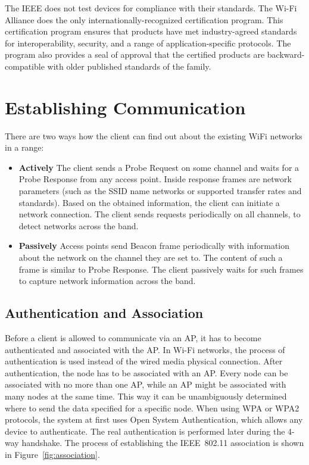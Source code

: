 The IEEE does not test devices for compliance with their standards. The Wi-Fi Alliance does the only internationally-recognized certification program. This certification program ensures that products have met industry-agreed standards for interoperability, security, and a range of application-specific protocols. The program also provides a seal of approval that the certified products are backward-compatible with older published standards of the family.

\section{Establishing Communication}

There are two ways how the client can find out about the existing WiFi networks in a range:

\begin{itemize}
\item \textbf{Actively} The client sends a Probe Request on some channel and waits for a Probe Response from any access point. Inside response frames are network parameters (such as the SSID name networks or supported transfer rates and standards). Based on the obtained information, the client can initiate a network connection. The client sends requests periodically on all channels, to detect networks across the band.
\item \textbf{Passively} Access points send Beacon frame periodically with information about the network on the channel they are set to. The content of such a frame is similar to Probe Response. The client passively waits for such frames to capture network information across the band.
\end{itemize}

\subsection{Authentication and Association}

Before a client is allowed to communicate via an AP, it has to become authenticated and associated with the AP. In Wi-Fi networks, the process of authentication is used instead of the wired media physical connection. After authentication, the node has to be associated with an AP. Every node can be associated with no more than one AP, while an AP might be associated with many nodes at the same time. This way it can be unambiguously determined where to send the data specified for a specific node. When using WPA or WPA2 protocols, the system at first uses Open System Authentication, which allows any device to authenticate. The real authentication is performed later during the 4-way handshake. The process of establishing the IEEE~802.11 association is shown in Figure~\ref{fig:association}.

